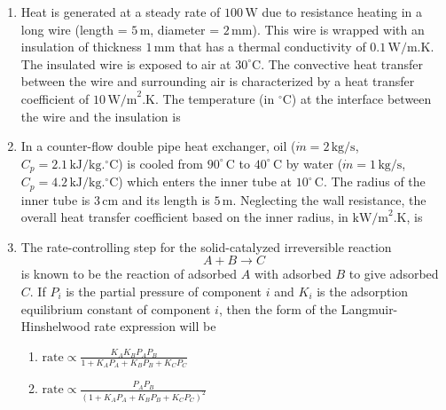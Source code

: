 \documentclass[journal,12pt,onecolumn]{IEEEtran}
\theoremstyle{remark}
\begin{document}
\begin{enumerate}
\item Heat is generated at a steady rate of $100 \, \text{W}$ due to resistance heating in a long wire (length = $5 \, \text{m}$, diameter = $2 \, \text{mm}$). This wire is wrapped with an insulation of thickness $1 \, \text{mm}$ that has a thermal conductivity of $0.1 \, \text{W/m.K}$. The insulated wire is exposed to air at $30^\circ\text{C}$. The convective heat transfer between the wire and surrounding air is characterized by a heat transfer coefficient of $10 \, \text{W/m}^2.\text{K}$. The temperature (in $^\circ\text{C}$) at the interface between the wire and the insulation is
\hfill{}
\begin{enumerate}
\end{enumerate}

\item In a counter-flow double pipe heat exchanger, oil ($\dot{m} = 2 \, \text{kg/s}$, $C_p = 2.1 \, \text{kJ/kg}.^\circ\text{C}$) is cooled from $90^\circ \, \text{C}$ to $40^\circ \, \text{C}$ by water ($\dot{m} = 1 \, \text{kg/s}$, $C_p = 4.2 \, \text{kJ/kg}.^\circ\text{C}$) which enters the inner tube at $10^\circ \, \text{C}$. The radius of the inner tube is $3 \, \text{cm}$ and its length is $5 \, \text{m}$. Neglecting the wall resistance, the overall heat transfer coefficient based on the inner radius, in $\text{kW/m}^2.\text{K}$, is
\hfill{}
\begin{enumerate}
\end{enumerate}

\item The rate-controlling step for the solid-catalyzed irreversible reaction
\[A + B \longrightarrow C\]
is known to be the reaction of adsorbed $A$ with adsorbed $B$ to give adsorbed $C$. If $P_i$ is the partial pressure of component $i$ and $K_i$ is the adsorption equilibrium constant of component $i$, then the form of the Langmuir-Hinshelwood rate expression will be
\hfill{}
\begin{enumerate}
\item  $\text{rate} \propto \frac{K_A K_B P_A P_B}{1+K_A P_A + K_B P_B + K_C P_C}$
\item $\text{rate} \propto \frac{P_A P_B}{(1+K_A P_A + K_B P_B + K_C P_C)^2}$


\end{enumerate}
\end{enumerate}
\end{document}
